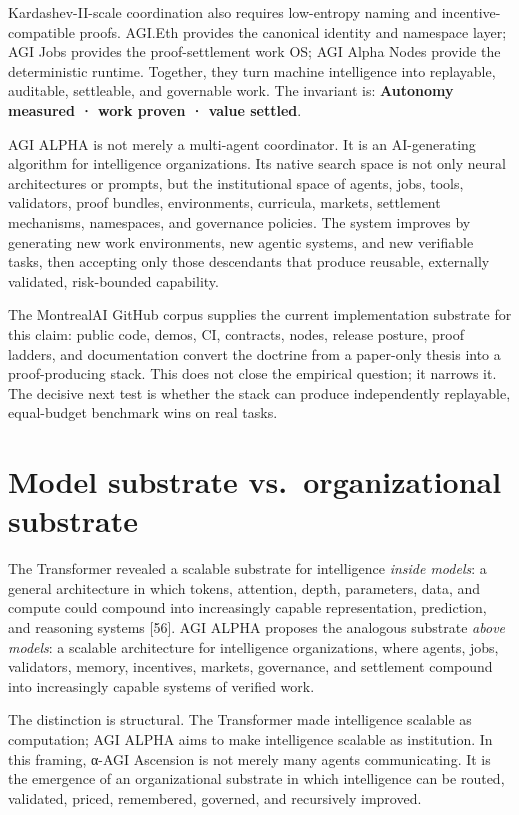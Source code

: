 Kardashev-II-scale coordination also requires low-entropy naming and
incentive-compatible proofs. AGI.Eth provides the canonical identity and
namespace layer; AGI Jobs provides the proof-settlement work OS; AGI
Alpha Nodes provide the deterministic runtime. Together, they turn
machine intelligence into replayable, auditable, settleable, and
governable work. The invariant is: \textbf{Autonomy measured · work
proven · value settled}.

AGI ALPHA is not merely a multi-agent coordinator. It is an
AI-generating algorithm for intelligence organizations. Its native
search space is not only neural architectures or prompts, but the
institutional space of agents, jobs, tools, validators, proof bundles,
environments, curricula, markets, settlement mechanisms, namespaces, and
governance policies. The system improves by generating new work
environments, new agentic systems, and new verifiable tasks, then
accepting only those descendants that produce reusable, externally
validated, risk-bounded capability.

The MontrealAI GitHub corpus supplies the current implementation
substrate for this claim: public code, demos, CI, contracts, nodes,
release posture, proof ladders, and documentation convert the doctrine
from a paper-only thesis into a proof-producing stack. This does not
close the empirical question; it narrows it. The decisive next test is
whether the stack can produce independently replayable, equal-budget
benchmark wins on real tasks.

\section{Model substrate vs.~organizational
substrate}\label{model-substrate-vs.-organizational-substrate}

The Transformer revealed a scalable substrate for intelligence
\emph{inside models}: a general architecture in which tokens, attention,
depth, parameters, data, and compute could compound into increasingly
capable representation, prediction, and reasoning systems {[}56{]}. AGI
ALPHA proposes the analogous substrate \emph{above models}: a scalable
architecture for intelligence organizations, where agents, jobs,
validators, memory, incentives, markets, governance, and settlement
compound into increasingly capable systems of verified work.

The distinction is structural. The Transformer made intelligence
scalable as computation; AGI ALPHA aims to make intelligence scalable as
institution. In this framing, α-AGI Ascension is not merely many agents
communicating. It is the emergence of an organizational substrate in
which intelligence can be routed, validated, priced, remembered,
governed, and recursively improved.

